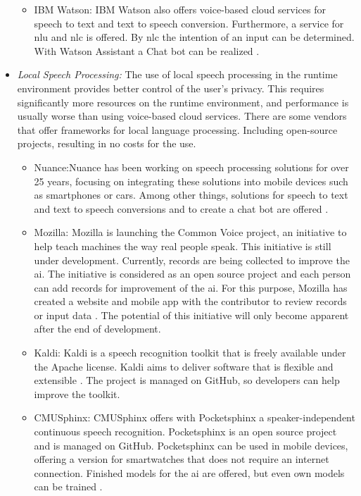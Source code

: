 \begin{itemize}
\begin{itemize}
		\item IBM Watson: IBM Watson also offers voice-based cloud services for speech to text and text to speech conversion. Furthermore, a service for \ac{nlu} and \ac{nlc} is offered. By \ac{nlc} the intention of an input can be determined. With Watson Assistant a Chat bot can be realized \cite{IBMWatsonSpeechServices}.
	\end{itemize}
	\item \textsl{Local Speech Processing:} The use of local speech processing in the runtime environment provides better control of the user's privacy. This requires significantly more resources on the runtime environment, and performance is usually worse than using voice-based cloud services. There are some vendors that offer frameworks for local language processing. Including open-source projects, resulting in no costs for the use.
	\begin{itemize}
		\item Nuance:Nuance has been working on speech processing solutions for over 25 years, focusing on integrating these solutions into mobile devices such as smartphones or cars. Among other things, solutions for speech to text and text to speech conversions and to create a chat bot are offered \cite{Nuance}. 
		\item Mozilla: Mozilla is launching the Common Voice project, an initiative to help teach machines the way real people speak. This initiative is still under development. Currently, records are being collected to improve the \ac{ai}. The initiative is considered as an open source project and each person can add records for improvement of the \ac{ai}. For this purpose, Mozilla has created a website and mobile app with the contributor to review records or input data \cite{MozillaCommonVoice}. The potential of this initiative will only become apparent after the end of development.
		\item Kaldi: Kaldi is a speech recognition toolkit that is freely available under the Apache license. Kaldi aims to deliver software that is flexible and extensible \cite{Kaldi}. The project is managed on GitHub, so developers can help improve the toolkit.
		\item CMUSphinx: CMUSphinx offers with Pocketsphinx a speaker-independent continuous speech recognition. Pocketsphinx is an open source project and is managed on GitHub. Pocketsphinx can be used in mobile devices, offering a version for smartwatches that does not require an internet connection. Finished models for the \ac{ai} are offered, but even own models can be trained \cite{Pocketsphinx}.
	\end{itemize}
\end{itemize}

